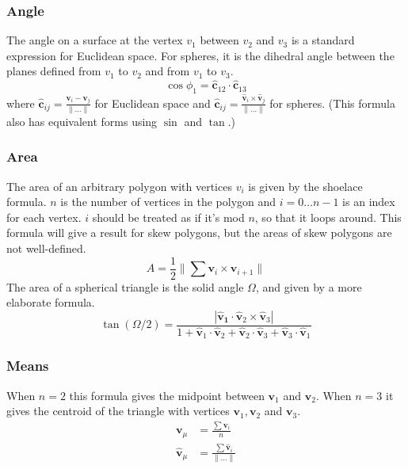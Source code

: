 \documentclass{amsart}[12pt]
\begin{document}
\subsubsection{Angle}
The angle on a surface at the vertex $v_1$ between $v_2$ and $v_3$ is a
standard expression for Euclidean space. For spheres, it is the dihedral angle
between the planes defined from $v_1$ to $v_2$ and from $v_1$ to $v_3$.
\begin{equation}
  \cos\phi_1 = \mathbf{\hat{c}}_{12} \cdot \mathbf{\hat{c}}_{13}
\end{equation}
where $\mathbf{\hat{c}}_{ij} = \frac{\mathbf{v}_i - \mathbf{v}_j}{\|\dots\|}$
for Euclidean space and $\mathbf{\hat{c}}_{ij} = \frac{\mathbf{\hat{v}}_i
\times \mathbf{\hat{v}}_j}{\|\dots\|}$ for spheres. (This formula also has
equivalent forms using $\sin$ and $\tan$.)

\subsubsection{Area}
The area of an arbitrary polygon with vertices $v_i$ is given by the shoelace
formula. $n$ is the number of vertices in the polygon and
$i = 0 \dots n-1$ is an index for each vertex. $i$ should be treated as if it's
mod $n$, so that it loops around. This formula will give a result for skew
polygons, but the areas of skew polygons are not well-defined.
\begin{equation}
A = \frac{1}{2} \| \sum \mathbf v_i\times \mathbf v_{i+1} \|
\end{equation}
The area of a spherical triangle is the solid angle $\Omega$,
and given by a more elaborate formula. \cite{oosterom}\cite{eriksson}
\begin{equation}
\tan(\Omega/2) = \frac{|\mathbf{\hat{v}_1} \cdot
       \mathbf{\hat{v}}_2 \times \mathbf{\hat{v}}_3|}
       {1+\mathbf{\hat{v}}_1\cdot \mathbf{\hat{v}}_2+\mathbf{\hat{v}}_2
       \cdot \mathbf{\hat{v}}_3+\mathbf{\hat{v}}_3\cdot \mathbf{\hat{v}}_1}
\end{equation}

\subsubsection{Means}
When $n=2$ this formula gives the midpoint between $\mathbf v_1$ and
$\mathbf v_2$. When $n=3$ it gives the centroid of the triangle with
vertices $\mathbf v_1, \mathbf v_2$ and $\mathbf v_3$.
\begin{equation}\begin{split}
\mathbf v_\mu & = \frac{\sum\mathbf v_i}{n} \\
\mathbf{\hat{v}}_\mu & = \frac{\sum\mathbf{\hat{v}}_i}{\|\dots\|}
\end{split}\end{equation}
\end{document}
